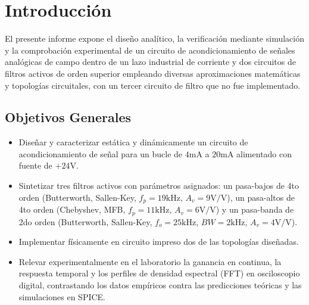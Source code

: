 \chapter{Introducción}

El presente informe expone el diseño analítico, la verificación mediante simulación y la comprobación experimental de un
circuito de acondicionamiento de señales analógicas de campo dentro de un lazo industrial de corriente y dos circuitos de
filtros activos de orden superior empleando diversas aproximaciones matemáticas y topologías circuitales, con un tercer
circuito de filtro que no fue implementado.

\section{Objetivos Generales}

\begin{itemize}
    \item Diseñar y caracterizar estática y dinámicamente un circuito de acondicionamiento de señal para un bucle de $4
        \unit{\milli\ampere}$ a $20 \unit{\milli\ampere}$ alimentado con fuente de $+24 \unit{\volt}$.
    \item Sintetizar tres filtros activos con parámetros asignados: un pasa-bajos de 4to orden (Butterworth, Sallen-Key,
        $f_p = 19 \unit{\kilo\hertz}$, $A_v = 9 \unit{\volt\per\volt}$), un pasa-altos de 4to orden (Chebyshev, MFB,
        $f_p = 11 \unit{\kilo\hertz}$, $A_v = 6 \unit{\volt\per\volt}$) y un pasa-banda de 2do orden (Butterworth,
        Sallen-Key, $f_o = 25 \unit{\kilo\hertz}$, $BW = 2 \unit{\kilo\hertz}$, $A_v = 4 \unit{\volt\per\volt}$).
    \item Implementar físicamente en circuito impreso dos de las topologías diseñadas.
    \item Relevar experimentalmente en el laboratorio la ganancia en continua, la respuesta temporal y los perfiles de
        densidad espectral (FFT) en osciloscopio digital, contrastando los datos empíricos contra las predicciones
        teóricas y las simulaciones en SPICE.
\end{itemize}
